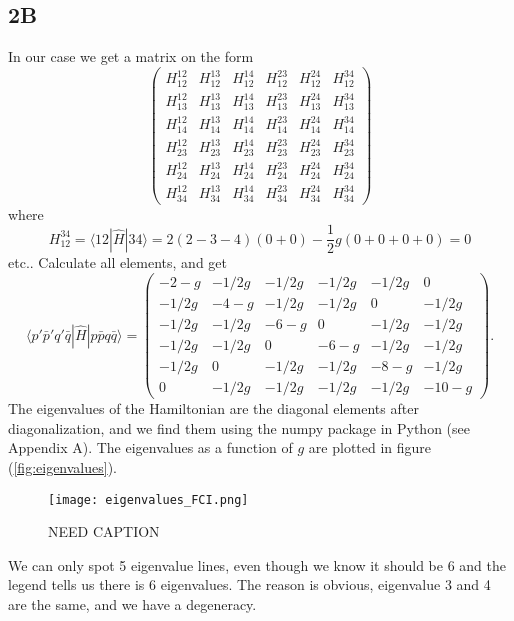 \documentclass[norsk,a4paper,12pt]{article}
\begin{document}
\subsection*{2B}
In our case we get a matrix on the form
\begin{equation}
\begin{pmatrix} 
H_{12}^{12}&H_{12}^{13}&H_{12}^{14}&H_{12}^{23}&H_{12}^{24}&H_{12}^{34}\\
H_{13}^{12}&H_{13}^{13}&H_{13}^{14}&H_{13}^{23}&H_{13}^{24}&H_{13}^{34}\\
H_{14}^{12}&H_{14}^{13}&H_{14}^{14}&H_{14}^{23}&H_{14}^{24}&H_{14}^{34}\\
H_{23}^{12}&H_{23}^{13}&H_{23}^{14}&H_{23}^{23}&H_{23}^{24}&H_{23}^{34}\\
H_{24}^{12}&H_{24}^{13}&H_{24}^{14}&H_{24}^{23}&H_{24}^{24}&H_{24}^{34}\\
H_{34}^{12}&H_{34}^{13}&H_{34}^{14}&H_{34}^{23}&H_{34}^{24}&H_{34}^{34} \end{pmatrix}
\end{equation}
where 
\begin{equation}
H_{12}^{34}=\langle 12|\hat{H}|34\rangle=2(2-3-4)(0+0)-\frac{1}{2}g(0+0+0+0)=0
\end{equation}
etc.. Calculate all elements, and get
\begin{equation}
\langle p'\bar{p}'q'\bar{q}|\hat{H}|p\bar{p}q\bar{q}\rangle=\begin{pmatrix} 
-2-g&-1/2g&-1/2g&-1/2g&-1/2g&0\\
-1/2g&-4-g&-1/2g&-1/2g&0&-1/2g\\
-1/2g&-1/2g&-6-g&0&-1/2g&-1/2g\\
-1/2g&-1/2g&0&-6-g&-1/2g&-1/2g\\
-1/2g&0&-1/2g&-1/2g&-8-g&-1/2g\\
0&-1/2g&-1/2g&-1/2g&-1/2g&-10-g \end{pmatrix}.
\end{equation}
The eigenvalues of the Hamiltonian are the diagonal elements after diagonalization, and we find them using the numpy package in Python (see Appendix A). The eigenvalues as a function of $g$ are plotted in figure (\ref{fig:eigenvalues}).
\begin{figure}[H]
\centering
\texttt{[image: eigenvalues\_FCI.png]}
\caption{NEED CAPTION \label{fig:eigenvalues_FCI}}
\end{figure}
We can only spot 5 eigenvalue lines, even though we know it should be 6 and the legend tells us there is 6 eigenvalues. The reason is obvious, eigenvalue 3 and 4 are the same, and we have a degeneracy. 
\end{document}
